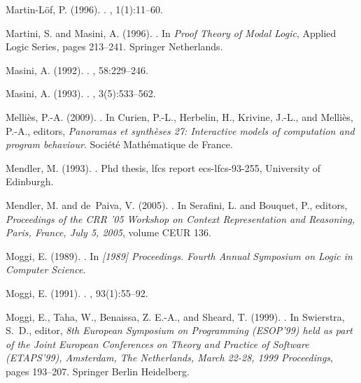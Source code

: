 \documentclass[a4paper]{amsart}
\begin{document}
\begin{thebibliography}{}
Martin-L{\"{o}}f, P. (1996).
.
, 1(1):11--60.

Martini, S. and Masini, A. (1996).
.
\newblock In {\em Proof Theory of Modal Logic}, Applied Logic Series, pages
  213--241. Springer Netherlands.

Masini, A. (1992).
.
, 58:229--246.

Masini, A. (1993).
.
, 3(5):533--562.

Melli{\`{e}}s, P.-A. (2009).
.
\newblock In Curien, P.-L., Herbelin, H., Krivine, J.-L., and Melli{\`{e}}s,
  P.-A., editors, {\em Panoramas et synth{\`{e}}ses 27: Interactive models of
  computation and program behaviour}. Soci{\'{e}}t{\'{e}} Math{\'{e}}matique de
  France.

Mendler, M. (1993).
.
\newblock Phd thesis, lfcs report ecs-lfcs-93-255, University of Edinburgh.

Mendler, M. and de~Paiva, V. (2005).
.
\newblock In Serafini, L. and Bouquet, P., editors, {\em Proceedings of the CRR
  '05 Workshop on Context Representation and Reasoning, Paris, France, July 5,
  2005}, volume CEUR 136.

Moggi, E. (1989).
.
\newblock In {\em [1989] Proceedings. Fourth Annual Symposium on Logic in
  Computer Science}.

Moggi, E. (1991).
.
, 93(1):55--92.

Moggi, E., Taha, W., Benaissa, Z. E.-A., and Sheard, T. (1999).
.
\newblock In Swierstra, S.~D., editor, {\em 8th European Symposium on
  Programming (ESOP'99) held as part of the Joint European Conferences on
  Theory and Practice of Software (ETAPS'99), Amsterdam, The Netherlands, March
  22-28, 1999 Proceedings}, pages 193--207. Springer Berlin Heidelberg.


\end{thebibliography}
\end{document}
